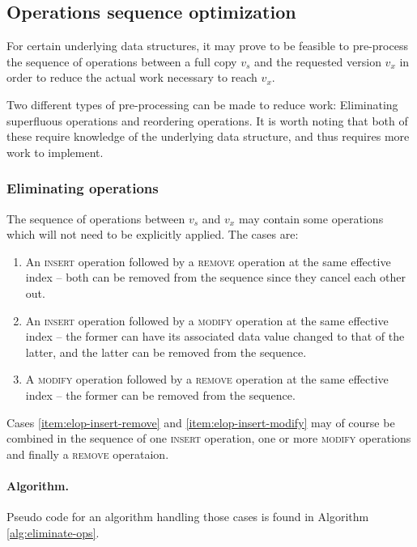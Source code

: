 \subsection{Operations sequence optimization}
For certain underlying data structures, it may prove to be feasible to
pre-process the sequence of operations between a full copy $v_s$ and the
requested version $v_x$ in order to reduce the actual work necessary to reach
$v_x$.

Two different types of pre-processing can be made to reduce work: Eliminating
superfluous operations and reordering operations. It is worth noting that both
of these require knowledge of the underlying data structure, and thus requires
more work to implement.

\subsubsection{Eliminating operations}
The sequence of operations between $v_s$ and $v_x$ may contain some operations
which will not need to be explicitly applied. The cases are:
\begin{enumerate}
  \item An \textsc{insert} operation followed by a \textsc{remove} operation at
  the same effective index -- both can be removed from the sequence since they
  cancel each other out.
  \label{item:elop-insert-remove}

  \item An \textsc{insert} operation followed by a \textsc{modify} operation at
  the same effective index -- the former can have its associated data value
  changed to that of the latter, and the latter can be removed from the
  sequence.
  \label{item:elop-insert-modify}

  \item A \textsc{modify} operation followed by a \textsc{remove} operation at
  the same effective index -- the former can be removed from the sequence.
  \label{item:elop-modify-remove}
\end{enumerate}

Cases \ref{item:elop-insert-remove} and \ref{item:elop-insert-modify} may of
course be combined in the sequence of one \textsc{insert} operation, one or more
\textsc{modify} operations and finally a \textsc{remove} operataion.


\paragraph{Algorithm.}
Pseudo code for an algorithm handling those cases is found in Algorithm
\ref{alg:eliminate-ops}.

